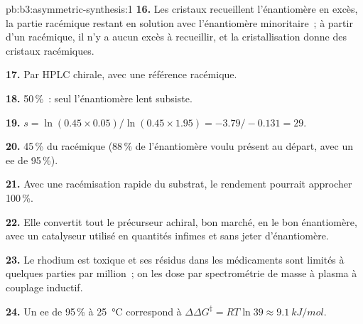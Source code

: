 \begin{solution}{pb:b3:asymmetric-synthesis:1}
\textbf{16.} Les cristaux recueillent l'énantiomère en excès, la partie
racémique restant en solution avec l'énantiomère minoritaire~; à partir
d'un racémique, il n'y a aucun excès à recueillir, et la cristallisation
donne des cristaux racémiques.

\textbf{17.} Par HPLC chirale, avec une référence racémique.

\textbf{18.} 50\,\%~: seul l'énantiomère lent subsiste.

\textbf{19.} $s = \ln(0.45 \times 0.05)/\ln(0.45 \times 1.95) = -3.79/-0.131 = 29$.

\textbf{20.} 45\,\% du racémique (88\,\% de l'énantiomère voulu présent au
départ, avec un ee de 95\,\%).

\textbf{21.} Avec une racémisation rapide du substrat, le rendement pourrait approcher 100\,\%.

\textbf{22.} Elle convertit tout le précurseur achiral, bon marché, en le
bon énantiomère, avec un catalyseur utilisé en quantités infimes et sans
jeter d'énantiomère.

\textbf{23.} Le rhodium est toxique et ses résidus dans les médicaments sont
limités à quelques parties par million~; on les dose par spectrométrie de
masse à plasma à couplage inductif.

\textbf{24.} Un ee de 95\,\% à \qty{25}{\celsius} correspond à $\Delta\Delta G^\ddagger = RT\ln 39 \approx \qty{9.1}{kJ/mol}$.
\end{solution}
